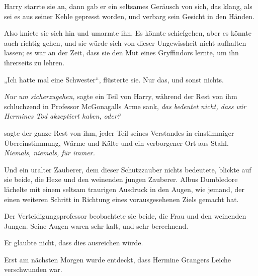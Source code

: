 Harry starrte sie an, dann gab er ein seltsames Geräusch von sich, das klang, als sei es aus seiner Kehle gepresst worden, und verbarg sein Gesicht in den Händen.

Also kniete sie sich hin und umarmte ihn. Es könnte schiefgehen, aber es könnte auch richtig gehen, und sie würde sich von dieser Ungewissheit nicht aufhalten lassen; es war an der Zeit, dass sie den Mut eines Gryffindors lernte, um ihn ihrerseits zu lehren.

„Ich hatte mal eine Schwester“, flüsterte sie. Nur das, und sonst nichts.

\later

\emph{Nur um sicherzugehen,} sagte ein Teil von Harry, während der Rest von ihm schluchzend in Professor McGonagalls Arme sank, \emph{das bedeutet nicht, dass wir Hermines Tod akzeptiert haben, oder?}

\emph{} sagte der ganze Rest von ihm, jeder Teil seines Verstandes in einstimmiger Übereinstimmung, Wärme und Kälte und ein verborgener Ort aus Stahl.
\emph{Niemals, niemals, für immer.}

\later

Und ein uralter Zauberer, dem dieser Schutzzauber nichts bedeutete, blickte auf sie beide, die Hexe und den weinenden jungen Zauberer. Albus Dumbledore lächelte mit einem seltsam traurigen Ausdruck in den Augen, wie jemand, der einen weiteren Schritt in Richtung eines vorausgesehenen Ziels gemacht hat.

\later

Der Verteidigungsprofessor beobachtete sie beide, die Frau und den weinenden Jungen. Seine Augen waren sehr kalt, und sehr berechnend.

Er glaubte nicht, dass dies ausreichen würde.

\later

Erst am nächsten Morgen wurde entdeckt, dass Hermine Grangers Leiche verschwunden war.

